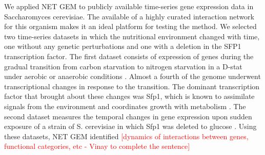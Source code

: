 \documentclass{bioinfo}
\begin{document}
We applied NET GEM to publicly available time-series gene expression
data in Saccharomyces cerevisiae. The available of a highly curated
interaction network for this organism makes it an ideal platform for
testing the method. We selected two time-series datasets in which the
nutritional environment changed with time, one without any genetic
perturbations and one with a deletion in the SFP1 transcription
factor. The first dataset consists of expression of genes during the
gradual transition from carbon starvation to nitrogen starvation in a
D-stat under aerobic or anaerobic conditions . Almost a fourth of the genome underwent transcriptional changes
in response to the transition. The dominant transcription factor that
brought about these changes was Sfp1, which is known to assimilate
signals from the environment and coordinates growth with metabolism
. The second dataset measures the temporal
changes in gene expression upon sudden exposure of a strain of
S. cerevisiae in which Sfp1 was deleted to glucose . Using these datasets, NET GEM identified
\textcolor{red}{[dynamics of interactions between genes, functional
  categories, etc  - Vinay to complete the sentence]} 
 
\end{document}
